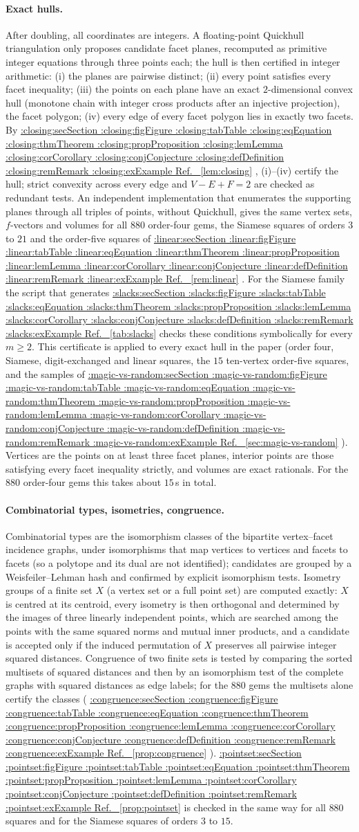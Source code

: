 \documentclass[11pt,a4paper]{article}
\makeatletter
\def\Cref@getprefix#1:#2\relax{#1}
\def\Cref@prefix@sec{sec}
\def\Cref@prefix@fig{fig}
\def\Cref@prefix@tab{tab}
\def\Cref@prefix@eq{eq}
\def\Cref@prefix@thm{thm}
\def\Cref@prefix@prop{prop}
\def\Cref@prefix@lem{lem}
\def\Cref@prefix@cor{cor}
\def\Cref@prefix@conj{conj}
\def\Cref@prefix@def{def}
\def\Cref@prefix@rem{rem}
\def\Cref@prefix@ex{ex}
\def\Cref@type@cap#1{%
  \edef\Cref@tmp{#1}%
  \ifx\Cref@tmp\Cref@prefix@sec Section%
  \else\ifx\Cref@tmp\Cref@prefix@fig Figure%
  \else\ifx\Cref@tmp\Cref@prefix@tab Table%
  \else\ifx\Cref@tmp\Cref@prefix@eq Equation%
  \else\ifx\Cref@tmp\Cref@prefix@thm Theorem%
  \else\ifx\Cref@tmp\Cref@prefix@prop Proposition%
  \else\ifx\Cref@tmp\Cref@prefix@lem Lemma%
  \else\ifx\Cref@tmp\Cref@prefix@cor Corollary%
  \else\ifx\Cref@tmp\Cref@prefix@conj Conjecture%
  \else\ifx\Cref@tmp\Cref@prefix@def Definition%
  \else\ifx\Cref@tmp\Cref@prefix@rem Remark%
  \else\ifx\Cref@tmp\Cref@prefix@ex Example%
  \else Ref.%
  \fi\fi\fi\fi\fi\fi\fi\fi\fi\fi\fi\fi
}
\DeclareRobustCommand{\Cref}[1]{%
  \begingroup
  \edef\Cref@label{#1}%
  \edef\Cref@prefix{\expandafter\Cref@getprefix\Cref@label:\relax}%
  \hyperref[#1]{\Cref@type@cap{\Cref@prefix}~\ref*{#1}}%
  \endgroup
}
\theoremstyle{plain}
\theoremstyle{definition}
\theoremstyle{remark}
\makeatother
\begin{document}
\paragraph{Exact hulls.}
After doubling, all coordinates are integers.
A floating-point Quickhull triangulation only proposes candidate facet planes, recomputed as primitive integer equations through three points each; the hull is then certified in integer arithmetic:
(i) the planes are pairwise distinct;
(ii) every point satisfies every facet inequality;
(iii) the points on each plane have an exact $2$-dimensional convex hull (monotone chain with integer cross products after an injective projection), the facet polygon;
(iv) every edge of every facet polygon lies in exactly two facets.
By \Cref{lem:closing}, (i)--(iv) certify the hull; strict convexity across every edge and $V-E+F=2$ are checked as redundant tests.
An independent implementation that enumerates the supporting planes through all triples of points, without Quickhull, gives the same vertex sets, $f$-vectors and volumes for all $880$ order-four gems, the Siamese squares of orders $3$ to $21$ and the order-five squares of \Cref{rem:linear}. For the Siamese family the script that generates \Cref{tab:slacks} checks these conditions symbolically for every $m\ge2$.
This certificate is applied to every exact hull in the paper (order four, Siamese, digit-exchanged and linear squares, the $15$ ten-vertex order-five squares, and the samples of \Cref{sec:magic-vs-random}).
Vertices are the points on at least three facet planes, interior points are those satisfying every facet inequality strictly, and volumes are exact rationals.
For the $880$ order-four gems this takes about $15$\,s in total.

\paragraph{Combinatorial types, isometries, congruence.}
Combinatorial types are the isomorphism classes of the bipartite vertex--facet incidence graphs, under isomorphisms that map vertices to vertices and facets to facets (so a polytope and its dual are not identified); candidates are grouped by a Weisfeiler--Lehman hash and confirmed by explicit isomorphism tests.
Isometry groups of a finite set $X$ (a vertex set or a full point set) are computed exactly: $X$ is centred at its centroid, every isometry is then orthogonal and determined by the images of three linearly independent points, which are searched among the points with the same squared norms and mutual inner products, and a candidate is accepted only if the induced permutation of $X$ preserves all pairwise integer squared distances.
Congruence of two finite sets is tested by comparing the sorted multisets of squared distances and then by an isomorphism test of the complete graphs with squared distances as edge labels; for the $880$ gems the multisets alone certify the classes (\Cref{prop:congruence}).
\Cref{prop:pointset} is checked in the same way for all $880$ squares and for the Siamese squares of orders $3$ to $15$.
\end{document}
